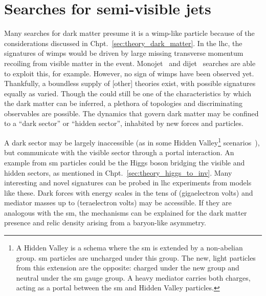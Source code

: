 



\section{Searches for semi-visible jets}
\label{sec:theory_svj}

Many searches for dark matter presume it is a \acrshort{wimp}-like particle because of the considerations discussed in Chpt.~\ref{sec:theory_dark_matter}. In the \acrshort{lhc}, the signatures of \glspl{wimp} would be driven by large missing transverse momentum recoiling from visible matter in the event. Monojet~\cite{Khachatryan:2014rra} and dijet~\cite{Sirunyan:2016iap} searches are able to exploit this, for example. However, no sign of \glspl{wimp} have been observed yet. Thankfully, a boundless supply of [other] theories exist, with possible signatures equally as varied. Though the \ptmiss could still be one of the characteristics by which the dark matter can be inferred, a plethora of topologies and discriminating observables are possible. The dynamics that govern dark matter may be confined to a ``dark sector'' or ``hidden sector'', inhabited by new forces and particles.

A dark sector may be largely inaccessible (as in some Hidden Valley\footnote{A Hidden Valley is a schema where the \acrlong{sm} is extended by a non-abelian group. \acrshort{sm} particles are uncharged under this group. The new, light particles from this extension are the opposite: charged under the new group and neutral under the \acrshort{sm} gauge group. A heavy mediator carries both charges, acting as a portal between the \acrlong{sm} and Hidden Valley particles.} scenarios~\cite{Strassler:2006im}), but communicate with the visible sector through a portal interaction. An example from \acrshort{sm} particles could be the Higgs boson bridging the visible and hidden sectors, as mentioned in Chpt.~\ref{sec:theory_higgs_to_inv}. Many interesting and novel signatures can be probed in \acrshort{lhc} experiments from models like these. Dark forces with energy scales in the tens of \tGeV (gigaelectron volts) and mediator masses up to \tTeV (teraelectron volts) may be accessible. If they are analogous with the \acrlong{sm}, the mechanisms can be explained for the dark matter presence and relic density arising from a baryon-like asymmetry.

